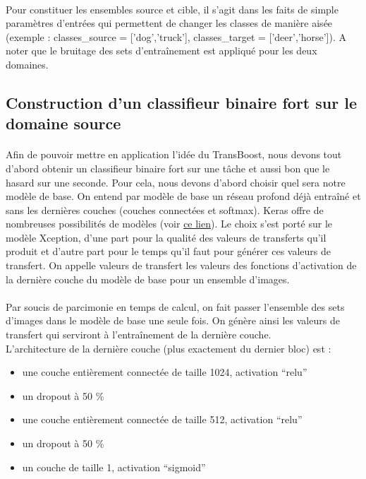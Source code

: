 \documentclass[11 pt]{article}
\begin{document}
\paragraph{}Pour constituer les ensembles source et cible, il s’agit dans les faits de simple paramètres d’entrées qui permettent de changer les classes de manière aisée (exemple : classes\_source = ['dog','truck'], classes\_target = ['deer','horse']). A noter que le bruitage des sets d’entraînement est appliqué pour les deux domaines.

\subsection{Construction d'un classifieur binaire fort sur le domaine source}
\paragraph{}Afin de pouvoir mettre en application l’idée du TransBoost, nous devons tout d’abord obtenir un classifieur binaire fort sur une tâche et aussi bon que le hasard sur une seconde. Pour cela, nous devons d’abord choisir quel sera notre modèle de base. On entend par modèle de base un réseau profond déjà entraîné et sans les dernières couches (couches connectées et softmax). Keras offre de nombreuses possibilités de modèles (voir \href{https://keras.io/applications/}{ce lien}). Le choix s’est porté sur le modèle Xception, d’une part pour la qualité des valeurs de transferts qu’il produit et d’autre part pour le temps qu’il faut pour générer ces valeurs de transfert. On appelle valeurs de transfert les valeurs des fonctions d’activation de la dernière couche du modèle de base pour un ensemble d’images.

\paragraph{}Par soucis de parcimonie en temps de calcul, on fait passer l’ensemble des sets d’images dans le modèle de base une seule fois. On génère ainsi les valeurs de transfert qui serviront à l’entraînement de la dernière couche. \\
L’architecture de la dernière couche (plus exactement du dernier bloc) est :\\ \medskip
\begin{itemize}
  \item une couche entièrement connectée de taille 1024, activation “relu”
  \item un dropout à 50 \%
  \item une couche entièrement connectée de taille 512, activation “relu”
  \item un dropout à 50 \%
  \item un couche de taille 1, activation “sigmoid”
\end{itemize}
\end{document}
